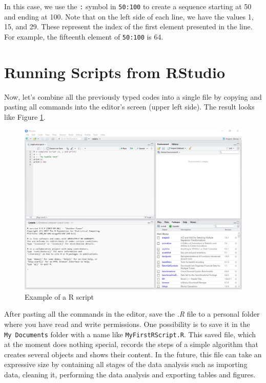 \documentclass[11pt,]{book}
\begin{document}
In this case, we use the \texttt{:} symbol in \texttt{50:100} to create
a sequence starting at 50 and ending at 100. Note that on the left side
of each line, we have the values 1, 15, and 29. These represent the
index of the first element presented in the line. For example, the
fifteenth element of \texttt{50:100} is 64.

\section{Running Scripts from
RStudio}\label{running-scripts-from-rstudio}

Now, let's combine all the previously typed codes into a single file by
copying and pasting all commands into the editor's screen (upper left
side). The result looks like Figure \ref{fig:example-script}.

\begin{figure}[!htbp]

{\centering \includegraphics[width=1\linewidth]{figs/RStudio_example_script} 

}

\caption{Example of a R script}\label{fig:example-script}
\end{figure}

After pasting all the commands in the editor, save the \emph{.R} file to
a personal folder where you have read and write permissions. One
possibility is to save it in the \texttt{My\ Documents} folder with a
name like \texttt{\textquotesingle{}MyFirstRScript.R\textquotesingle{}}.
This saved file, which at the moment does nothing special, records the
steps of a simple algorithm that creates several objects and shows their
content. In the future, this file can take an expressive size by
containing all stages of the data analysis such as importing data,
cleaning it, performing the data analysis and exporting tables and
figures.
\end{document}
